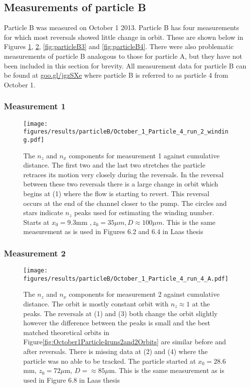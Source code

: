 \subsection{Measurements of particle B}
Particle B was measured on October 1 2013. Particle B has four measurements for which most reversals showed little change in orbit. These are shown below in Figures \ref{fig:particleB1}, \ref{fig:particleB2}, \ref{fig:particleB3} and \ref{fig:particleB4}. There were also problematic measurements of particle B analogous to those for particle A, but they have not been included in this section for brevity. All measurement data for particle B can be found at \url{goo.gl/jgzSXe} where particle B is referred to as particle 4 from October 1. 

\subsubsection{Measurement 1}
\begin{figure}[H]
\begin{center}
\texttt{[image: figures/results/particleB/October\_1\_Particle\_4\_run\_2\_winding.pdf]}
\end{center}
\caption{The $n_z$ and $n_x$ components for measurement 1 against cumulative distance. The first two and the last two stretches the particle retraces its motion very closely during the reversals. In the reversal between these two reversals there is a large change in orbit which begins at (1) where the flow is starting to revert. This reversal occurs at the end of the channel closer to the pump. The circles and stars indicate $n_z$ peaks used for estimating the winding number. Starts at $ x_0 = 9.3$mm $,z_0 = 35\mu m, D \approx 100\mu m$. This is the same measurement as is used in Figures 6.2 and 6.4 in Laas thesis~\cite{alexanderThesis}}
\label{fig:particleB1}
\end{figure}
	


\subsubsection{Measurement 2}

\begin{figure}[H]
\begin{center}
\texttt{[image: figures/results/particleB/October\_1\_Particle\_4\_run\_4\_A.pdf]}
\end{center}
\caption{The $n_z$ and $n_x$ components for measurement 2 against cumulative distance. The orbit is mostly constant orbit with $n_z \approx 1$ at the peaks. The reversals at (1) and (3) both change the orbit slightly however the difference between the peaks is small and the best matched theoretical orbits in Figure\ref{fig:October1Particle4runs2and2Orbits} are similar before and after reversals. There is missing data at (2) and (4) where the particle was no able to be tracked. The particle started at $x_0 = 28.6$mm, $z_0 = 72\mu$m, $D = \approx 85\mu$m. This is the same measurement as is used in Figure 6.8 in Laas thesis~\cite{alexanderThesis}}
\label{fig:particleB2}
\end{figure}

